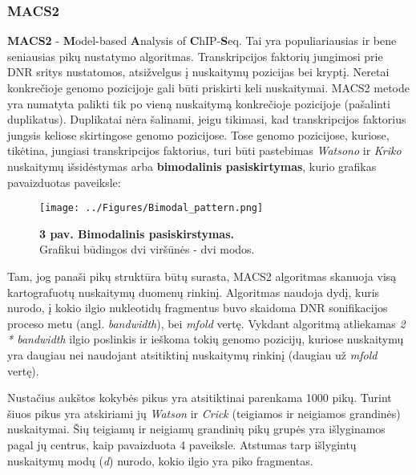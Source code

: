\documentclass[12pt]{article}
\begin{document}
\subsubsection{MACS2}
\textbf{MACS2} - \textbf{M}odel-based \textbf{A}nalysis of
\textbf{C}hIP-\textbf{S}eq. Tai yra populiariausias ir bene seniausias
pikų nustatymo algoritmas.
Transkripcijos faktorių jungimosi prie DNR sritys nustatomos, atsižvelgus į
nuskaitymų pozicijas bei kryptį. Neretai konkrečioje genomo pozicijoje gali
būti priskirti keli nuskaitymai. MACS2 metode yra numatyta palikti tik po
vieną nuskaitymą konkrečioje pozicijoje (pašalinti duplikatus). Duplikatai
nėra šalinami, jeigu tikimasi, kad transkripcijos faktorius jungsis keliose
skirtingose genomo pozicijose. Tose genomo pozicijose, kuriose, tikėtina,
jungiasi transkripcijos faktorius, turi būti pastebimas \emph{Watsono} ir
\emph{Kriko} nuskaitymų išsidėstymas arba \textbf{bimodalinis pasiskirtymas},
kurio grafikas pavaizduotas paveiksle:

\begin{figure}[ht]
    \begin{center}
        \captionsetup{justification=centering}
        \texttt{[image: ../Figures/Bimodal\_pattern.png]}
        \vspace{-1\baselineskip}
        \caption*{\small\textbf{3 pav. Bimodalinis pasiskirstymas.}\\Grafikui
            būdingos dvi viršūnės - dvi modos.}
    \end{center}
\end{figure}

Tam, jog panaši pikų struktūra būtų surasta, MACS2 algoritmas skanuoja visą
kartografuotų nuskaitymų duomenų rinkinį. Algoritmas naudoja dydį, kuris nurodo,
į kokio ilgio nukleotidų fragmentus buvo skaidoma DNR sonifikacijos proceso
metu (angl. \emph{bandwidth}), bei \emph{mfold} vertę. Vykdant algoritmą
atliekamas \emph{2 * bandwidth} ilgio poslinkis ir ieškoma tokių genomo
pozicijų, kuriose nuskaitymų yra daugiau nei naudojant atsitiktinį nuskaitymų
rinkinį (daugiau už \emph{mfold} vertę).

Nustačius aukštos kokybės pikus yra atsitiktinai parenkama 1000 pikų. Turint
šiuos pikus yra atskiriami jų \emph{Watson} ir \emph{Crick} (teigiamos ir
neigiamos grandinės) nuskaitymai.
Šių teigiamų ir neigiamų grandinių pikų grupės yra išlyginamos pagal jų
centrus, kaip pavaizduota 4 paveiksle. Atstumas tarp išlygintų nuskaitymų
modų (\emph{d}) nurodo, kokio ilgio yra piko fragmentas.
\end{document}
